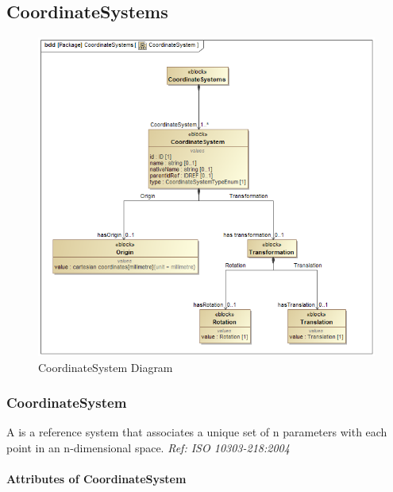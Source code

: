 \subsection{CoordinateSystems} \label{sec:CoordinateSystems}


\begin{figure}[ht]
  \centering
    \includegraphics[width=1.0\textwidth]{figures/CoordinateSystem.png}
  \caption{CoordinateSystem Diagram}
  \label{fig:CoordinateSystem}
\end{figure}

\FloatBarrier



\subsubsection{CoordinateSystem}
\label{sec:CoordinateSystem}



A  is a reference system that associates a unique set of n parameters with each point in an n-dimensional space. \textit{Ref: ISO 10303-218:2004}


\paragraph{Attributes of CoordinateSystem}\mbox{}
\label{sec:Attributes of CoordinateSystem}

